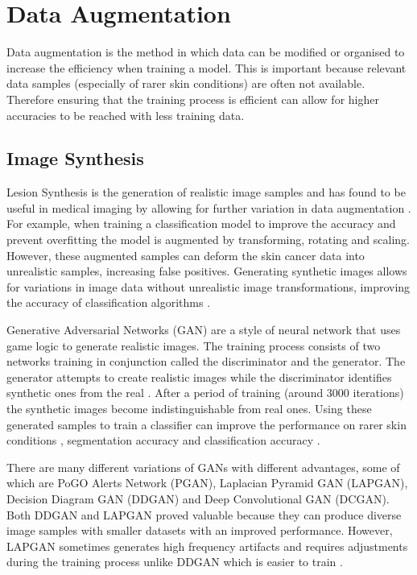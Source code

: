 \documentclass[12pt]{report}
\begin{document}
\section{Data Augmentation}
Data augmentation is the method in which data can be modified or organised to increase the efficiency when training a model. This is important because relevant data samples (especially of rarer skin conditions) are often not available. Therefore ensuring that the training process is efficient can allow for higher accuracies to be reached with less training data.

\subsection{Image Synthesis}
Lesion Synthesis is the generation of realistic image samples and has found to be useful in medical imaging by allowing for further variation in data augmentation \cite{Yi2019}. For example, when training a classification model to improve the accuracy and prevent overfitting the model is augmented by transforming, rotating and scaling. However, these augmented samples can deform the skin cancer data into unrealistic samples, increasing false positives. Generating synthetic images allows for variations in image data without unrealistic image transformations, improving the accuracy of classification algorithms \cite{Bissoto2019}.

Generative Adversarial Networks (GAN) are a style of neural network that uses game logic to generate realistic images. The training process consists of two networks training in conjunction called the discriminator and the generator. The generator attempts to create realistic images while the discriminator identifies synthetic ones from the real \cite{Yi2019}. After a period of training (around 3000 iterations) the synthetic images become indistinguishable from real ones. Using these generated samples to train a classifier can improve the performance on rarer skin conditions \cite{Ghorbani2019a}, segmentation accuracy \cite{Ghorbani2019a} and classification accuracy \cite{Bissoto2019}. 

There are many different variations of GANs with different advantages, some of which are PoGO Alerts Network (PGAN), Laplacian Pyramid GAN (LAPGAN), Decision Diagram GAN (DDGAN) and Deep Convolutional GAN (DCGAN). Both DDGAN and LAPGAN proved valuable because they can produce diverse image samples with smaller datasets with an improved performance. However, LAPGAN sometimes generates high frequency artifacts and requires adjustments during the training process unlike DDGAN which is easier to train \cite{Baur2018}.
\end{document}
